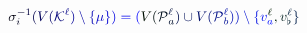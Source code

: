 \documentclass[12pt]{article}
\begin{document}
\makeatletter
\renewcommand*{\@textcolor}[3]{%
  \protect\leavevmode
  \begingroup
    \color#1{#2}#3%
  \endgroup
}
\makeatother
\begin{displaymath}
\mathcolor[RGB]{0,0,15}{\sigma} _ { \mathcolor[RGB]{0,0,30}{i} } ^ { \mathcolor[RGB]{0,0,45}{-} \mathcolor[RGB]{0,0,60}{1} } \mathcolor[RGB]{0,0,75}{(} \mathcolor[RGB]{0,0,90}{V} \mathcolor[RGB]{0,0,105}{(} \mathcal { \mathcolor[RGB]{0,0,120}{K} } ^ { \mathcolor[RGB]{0,0,135}{\ell} } \mathcolor[RGB]{0,0,150}{)} \mathcolor[RGB]{0,0,165}{\setminus} \mathcolor[RGB]{0,0,180}{\{} \mathcolor[RGB]{0,0,195}{\mu} \mathcolor[RGB]{0,0,210}{\}} \mathcolor[RGB]{0,0,225}{)} \mathcolor[RGB]{0,0,240}{=} \mathcolor[RGB]{0,0,255}{(} \mathcolor[RGB]{0,15,0}{V} \mathcolor[RGB]{0,15,15}{(} \mathcal { \mathcolor[RGB]{0,15,30}{P} } _ { \mathcolor[RGB]{0,15,45}{a} } ^ { \mathcolor[RGB]{0,15,60}{\ell} } \mathcolor[RGB]{0,15,75}{)} \mathcolor[RGB]{0,15,90}{\cup} \mathcolor[RGB]{0,15,105}{V} \mathcolor[RGB]{0,15,120}{(} \mathcal { \mathcolor[RGB]{0,15,135}{P} } _ { \mathcolor[RGB]{0,15,150}{b} } ^ { \mathcolor[RGB]{0,15,165}{\ell} } \mathcolor[RGB]{0,15,180}{)} \mathcolor[RGB]{0,15,195}{)} \mathcolor[RGB]{0,15,210}{\setminus} \mathcolor[RGB]{0,15,225}{\{} \mathcolor[RGB]{0,15,240}{v} _ { \mathcolor[RGB]{0,15,255}{a} } ^ { \mathcolor[RGB]{0,30,0}{\ell} } \mathcolor[RGB]{0,30,15}{,} \mathcolor[RGB]{0,30,30}{v} _ { \mathcolor[RGB]{0,30,45}{\flat} } ^ { \mathcolor[RGB]{0,30,60}{\ell} } \mathcolor[RGB]{0,30,75}{\}}
\end{displaymath}
\end{document}
